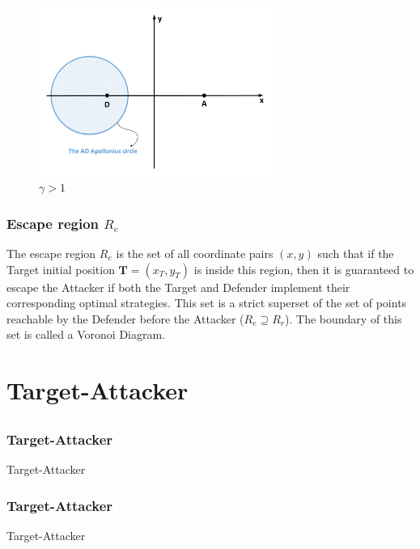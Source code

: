 \documentclass{beamer}
\begin{document}
\begin{frame}
\begin{figure}
\includegraphics[width=0.7\textwidth]{fig/drawing4_1c.pdf}
\caption {$\gamma>1$}
\end{figure}
\end{frame}
\begin{frame}
\frametitle{Escape region $R_e$}
The escape region $R_e$ is the set of all coordinate pairs $(x,y)$ such that if the Target initial position $\boldsymbol{T}=(x_{T},y_{T})$ is inside this region, then it is guaranteed to escape the Attacker if both the Target and Defender implement their corresponding optimal strategies. This set is a strict superset of the set of points reachable by the Defender before the Attacker ($R_e\supseteq R_r$). The boundary of this set is called a Voronoi Diagram.
\end{frame}


\section{Target-Attacker}

\subsection{} 
\begin{frame}
\frametitle{Target-Attacker}
Target-Attacker
\end{frame}
\begin{frame}
\frametitle{Target-Attacker}
Target-Attacker
\end{frame}
\end{document}

